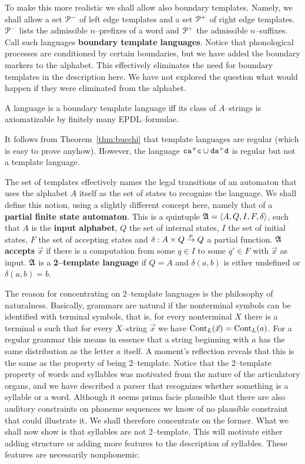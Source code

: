 To make this more realistic we shall allow also boundary templates.
Namely, we shall allow a set $\mathcal{P}^-$ of left edge templates and a set
$\mathcal{P}^+$ of right edge templates. $\mathcal{P}^-$ lists the admissible
$n$--prefixes of a word and $\mathcal{P}^+$ the admissible $n$--suffixes.
Call such languages \textbf{boundary template languages}. 
Notice that phonological processes are conditioned by certain boundaries, 
but we have added the boundary markers to the alphabet. This
effectively eliminates the need for boundary templates in the
description here. We have not explored the question what would happen
if they were eliminated from the alphabet.
\begin{prop}
A language is a boundary template language iff its
class of $A$--strings is axiomatizable by finitely many 
EPDL--formulae.
\end{prop}
It follows from Theorem~\ref{thm:buechi} that template languages are
regular (which is easy to prove anyhow). However, the language
$\mbox{\tt c}\mbox{\tt a} ^+\mbox{\tt c} \cup \mbox{\tt d}%
\mbox{\tt a}^+\mbox{\tt d}$ is regular but not a template
language.

The set of templates effectively names the legal
transitions of an automaton that uses the alphabet $A$ itself as
the set of states to recognize the language. We shall define this
notion, using a slightly different concept here, namely that of a
\textbf{partial finite state automaton}. This is a quintuple $\mathfrak{A} =
\langle A, Q, I, F, \delta\rangle$, such that $A$ is the \textbf{input
alphabet}, $Q$ the set of internal states, $I$ the set of initial
states, $F$ the set of accepting states and $\delta : A \times Q
\stackrel{p}{\rightarrow} Q$ a partial function. $\mathfrak{A}$ \textbf{accepts} $\vec{x}$
if there is a computation from some $q \in I$ to some $q' \in F$
with $\vec{x}$ as input. $\mathfrak{A}$ is a \textbf{2--template language} 
if $Q = A$ and $\delta(a,b)$ is either undefined or $\delta(a,b) = b$.

The reason for concentrating on 2--template languages is the philosophy
of naturalness. Basically, grammars are natural if the nonterminal
symbols can be identified with terminal symbols, that is, for 
every nonterminal $X$ there is a terminal $a$ such that for every 
$X$--string $\vec{x}$ we have $\operatorname{Cont}_L(\vec{x}) = \operatorname{Cont}_L(a)$. For 
a regular grammar this means in essence that a
string beginning with $a$ has the same distribution
as the letter $a$ itself. A moment's reflection reveals that this is
the same as the property of being 2--template. Notice that the 2--template
property of words and syllables was motivated from the nature
of the articulatory organs, and we have described a parser that
recognizes whether something is a syllable or a word. Although it
seems prima facie plausible that there are also auditory
constraints on phoneme sequences we know of no plausible constraint
that could illustrate it. We shall therefore concentrate on the
former. What we shall now show is that syllables are not 2--template.
This will motivate either adding structure or adding more features
to the description of syllables. These features are necessarily
nonphonemic.

